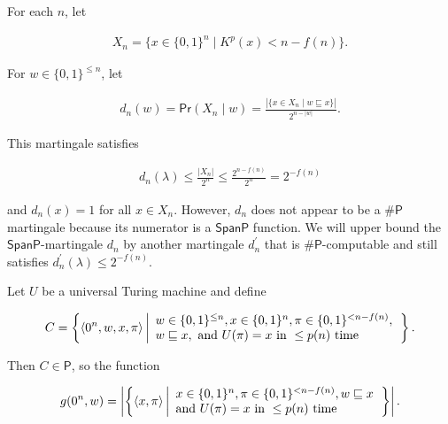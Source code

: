 For each $n$, let\par


\[\begin{gathered}
X_{n}=\{x\in\{0,1\}^{n}\mid K^{p}(x)<n-f(n)\}.
\end{gathered}\]


For $w\in\{0,1\}^{\leq n}$, let\par


\[\begin{gathered}
d_{n}(w)=\mathsf{Pr}(X_{n}\mid w)=\frac{|\{x\in X_{n}\mid w\sqsubseteq x\}|}{2^{n-|w|}}.
\end{gathered}\]


This martingale satisfies\par


\[\begin{gathered}
d_{n}(\lambda)\leq\frac{|X_{n}|}{2^{n}}\leq\frac{2^{n-f(n)}}{2^{n}}=2^{-f(n)}
\end{gathered}\]


and $d_{n}(x)=1$ for all $x\in X_{n}$. However, $d_{n}$ does not appear to be a ${\mathsf{\#}\mathsf{P}}$ martingale because its numerator is a $\mathsf{SpanP}$ function.
We will upper bound the $\mathsf{SpanP}$-martingale $d_{n}$ by another martingale $d_{n}^{\prime}$ that is ${\mathsf{\#}\mathsf{P}}$-computable and still satisfies $d_{n}^{\prime}(\lambda)\leq 2^{-f(n)}.$\par




Let $U$ be a universal Turing machine and define\par


\[\begin{gathered}
C=\left\{\langle 0^{n},w,x,\pi\rangle\left|\begin{array}[]{l}w\in\{0,1\}^{\leq
n},x\in\{0,1\}^{n},\pi\in\{0,1\}^{<n-f(n)},\\
w\sqsubseteq x,\textrm{ and }U(\pi)=x\textrm{ in }\leq p(n)\textrm{ time}\end{array}\right.\right\}.
\end{gathered}\]


Then $C\in\mathsf{P}$, so the function\par


\[\begin{gathered}
g(0^{n},w)=\left|\left\{\langle x,\pi\rangle\left|\begin{array}[]{l}x\in\{0,1\}^{n},\pi\in\{0,1\}^{<n-f(n)},w\sqsubseteq x\\
\textrm{and }U(\pi)=x\textrm{ in }\leq p(n)\textrm{ time}\end{array}\right.\right\}\right|.
\end{gathered}\]


